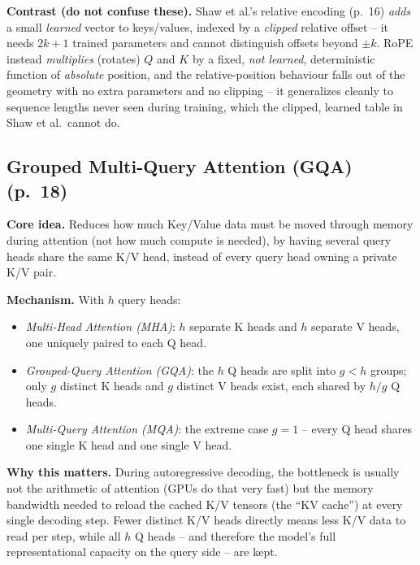 \documentclass[11pt]{article}
\begin{document}
\textbf{Contrast (do not confuse these).} Shaw et al.'s relative encoding (p.\ 16) \emph{adds} a small \emph{learned} vector to keys/values, indexed by a \emph{clipped} relative offset -- it needs $2k+1$ trained parameters and cannot distinguish offsets beyond $\pm k$. RoPE instead \emph{multiplies} (rotates) $Q$ and $K$ by a fixed, \emph{not learned}, deterministic function of \emph{absolute} position, and the relative-position behaviour falls out of the geometry with no extra parameters and no clipping -- it generalizes cleanly to sequence lengths never seen during training, which the clipped, learned table in Shaw et al.\ cannot do.

\subsection{Grouped Multi-Query Attention (GQA) (p.\ 18)}

\textbf{Core idea.} Reduces how much Key/Value data must be moved through memory during attention (not how much compute is needed), by having several query heads share the same K/V head, instead of every query head owning a private K/V pair.

\textbf{Mechanism.} With $h$ query heads:
\begin{itemize}
\item \emph{Multi-Head Attention (MHA)}: $h$ separate K heads and $h$ separate V heads, one uniquely paired to each Q head.
\item \emph{Grouped-Query Attention (GQA)}: the $h$ Q heads are split into $g<h$ groups; only $g$ distinct K heads and $g$ distinct V heads exist, each shared by $h/g$ Q heads.
\item \emph{Multi-Query Attention (MQA)}: the extreme case $g=1$ -- every Q head shares one single K head and one single V head.
\end{itemize}

\textbf{Why this matters.} During autoregressive decoding, the bottleneck is usually not the arithmetic of attention (GPUs do that very fast) but the memory bandwidth needed to reload the cached K/V tensors (the ``KV cache'') at every single decoding step. Fewer distinct K/V heads directly means less K/V data to read per step, while all $h$ Q heads -- and therefore the model's full representational capacity on the query side -- are kept.
\end{document}
